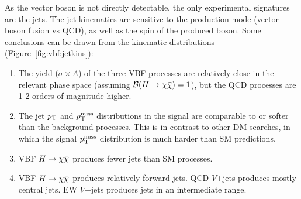 As the vector boson is not directly detectable, the only experimental signatures are the jets.
The jet kinematics are sensitive to the production mode (vector boson fusion vs QCD), as well as the spin of the produced boson.
Some conclusions can be drawn from the kinematic distributions (Figure~\ref{fig:vbf:jetkins}):
\begin{enumerate}
    \item The yield ($\sigma\times A$) of the three VBF processes are relatively close in the relevant phase space (assuming $\mathcal{B}(H\rightarrow\chi\bar\chi)=1$), but the QCD processes are 1-2 orders of magnitude higher.
    \item The jet $p_\mathrm{T}$ and $p_\mathrm{T}^\mathrm{miss}$ distributions in the signal are comparable to or softer than the background processes. 
          This is in contrast to other DM searches, in which the signal $p_\mathrm{T}^\mathrm{miss}$ distribution is much harder than SM predictions.
    \item VBF $H\rightarrow\chi\bar\chi$ produces fewer jets than SM processes.
    \item VBF $H\rightarrow\chi\bar\chi$ produces relatively forward jets. QCD $V$+jets produces mostly central jets. EW $V$+jets produces jets in an intermediate range. 
\end{enumerate}

